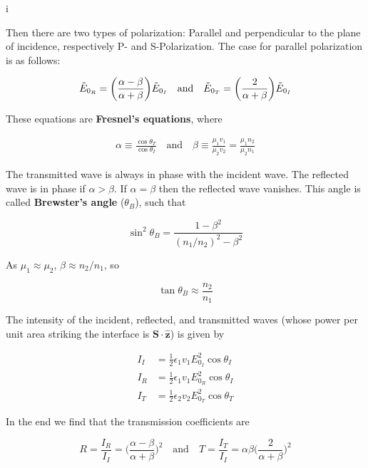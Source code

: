i\documentclass[a4paper]{article}
\begin{document}
Then there are two types of polarization: Parallel and perpendicular to the plane of incidence, respectively P- and S-Polarization. The case for parallel polarization is as follows:


\begin{align*}
    \Tilde{E}_{0_{R}}=\bigg(\frac{\alpha-\beta}{\alpha+\beta}\bigg)\Tilde{E}_{0_{I}}\quad\text{and}\quad\Tilde{E}_{0_{T}}=\bigg(\frac{2}{\alpha+\beta}\bigg)\Tilde{E}_{0_{I}}
\end{align*}

These equations are \textbf{Fresnel's equations}, where

\begin{align*}
    \alpha\equiv\frac{\cos\theta_T}{\cos\theta_I}\quad\text{and}\quad\beta\equiv\frac{\mu_1v_1}{\mu_2v_2}=\frac{\mu_1n_2}{\mu_2n_1}
\end{align*}

The transmitted wave is always in phase with the incident wave. The reflected wave is in phase if $\alpha>\beta$. If $\alpha=\beta$ then the reflected wave vanishes. This angle is called \textbf{Brewster's angle} ($\theta_B$), such that

\begin{equation*}
    \sin^2\theta_B=\frac{1-\beta^2}{(n_1/n_2)^2-\beta^2}
\end{equation*}

As $\mu_1\approx\mu_2$, $\beta\approx n_2/n_1$, so

\begin{equation*}
    \tan\theta_B\approx \frac{n_2}{n_1}
\end{equation*}

The intensity of the incident, reflected, and transmitted waves (whose power per unit area striking the interface is $\bm{S}\cdot\bm{\hat{z}}$) is given by

\begin{align*}
    I_I&=\frac{1}{2}\epsilon_1v_1E_{0_{I}}^2\cos\theta_I\\[1em]
    I_R&=\frac{1}{2}\epsilon_1v_1E_{0_{R}}^2\cos\theta_I\\[1em]
    I_T&=\frac{1}{2}\epsilon_2v_2E_{0_{T}}^2\cos\theta_T
\end{align*}

In the end we find that the transmission coefficients are 

\begin{equation*}
    R=\frac{I_R}{I_I}=\bigg(\frac{\alpha-\beta}{\alpha+\beta}\bigg)^2\quad\text{and}\quad T=\frac{I_T}{I_I}=\alpha\beta\bigg(\frac{2}{\alpha+\beta}\bigg)^2
\end{equation*}
\end{document}
